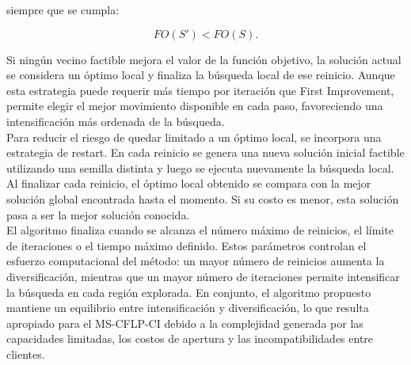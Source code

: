 \noindent siempre que se cumpla:

\[
FO(S') < FO(S).
\]

\noindent Si ningún vecino factible mejora el valor de la función objetivo, la solución actual se considera un óptimo local y finaliza la búsqueda local de ese reinicio. Aunque esta estrategia puede requerir más tiempo por iteración que First Improvement, permite elegir el mejor movimiento disponible en cada paso, favoreciendo una intensificación más ordenada de la búsqueda.\\

\noindent Para reducir el riesgo de quedar limitado a un óptimo local, se incorpora una estrategia de restart. En cada reinicio se genera una nueva solución inicial factible utilizando una semilla distinta y luego se ejecuta nuevamente la búsqueda local. Al finalizar cada reinicio, el óptimo local obtenido se compara con la mejor solución global encontrada hasta el momento. Si su costo es menor, esta solución pasa a ser la mejor solución conocida.\\

\noindent El algoritmo finaliza cuando se alcanza el número máximo de reinicios, el límite de iteraciones o el tiempo máximo definido. Estos parámetros controlan el esfuerzo computacional del método: un mayor número de reinicios aumenta la diversificación, mientras que un mayor número de iteraciones permite intensificar la búsqueda en cada región explorada. En conjunto, el algoritmo propuesto mantiene un equilibrio entre intensificación y diversificación, lo que resulta apropiado para el MS-CFLP-CI debido a la complejidad generada por las capacidades limitadas, los costos de apertura y las incompatibilidades entre clientes.